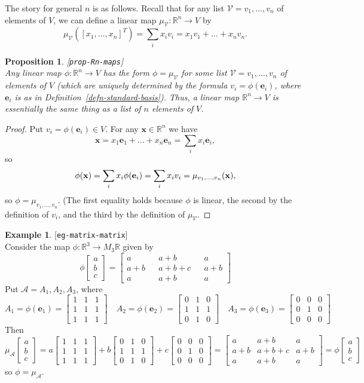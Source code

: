 \documentclass{amsart}
\newcommand{\lbl}[1]{\label{#1}\textup{[\texttt{#1}]}\ \\}
\newcommand{\lbl}{\label}
\newcommand{\R}         {{\mathbb{R}}}
\newcommand{\bsm}       {\left[\begin{smallmatrix}}
\newcommand{\esm}       {\end{smallmatrix}\right]}
\newcommand{\xra}       {\xrightarrow}
\newcommand{\ve}        {\mathbf{e}}
\newcommand{\vx}        {\mathbf{x}}
\newcommand{\CA}        {{\mathcal{A}}}
\newcommand{\CV}        {{\mathcal{V}}}
\renewcommand{\:}       {\colon}
\newtheorem{proposition}[theorem]{Proposition}
\theoremstyle{definition}
\newtheorem{example}[theorem]{Example}
\begin{document}
The story for general $n$ is as follows.  Recall that for
any list $\CV=v_1,\ldots,v_n$ of elements of $V$, we can
define a linear map $\mu_{\CV}\:\R^n\xra{}V$ by
\[ \mu_{\CV}([x_1,\ldots,x_n]^T) = \sum_i x_iv_i = 
     x_1v_1 + \ldots + x_nv_n.
\]

\begin{proposition}\lbl{prop-Rn-maps}
 Any linear map $\phi\:\R^n\xra{}V$ has the form
 $\phi=\mu_{\CV}$ for some list $\CV=v_1,\ldots,v_n$ of
 elements of $V$ (which are uniquely determined by the
 formula $v_i=\phi(\ve_i)$, where $\ve_i$ is as in
 Definition~\ref{defn-standard-basis}).  Thus, a linear map
 $\R^n\xra{}V$ is essentially the same thing as a list of
 $n$ elements of $V$.
\end{proposition}
\begin{proof}
 Put $v_i=\phi(\ve_i)\in V$.  For any $\vx\in\R^n$ we have 
 \[ \vx = x_1\ve_1+\ldots+x_n\ve_n = \sum_i x_i\ve_i, \]
 so 
 \[
  \phi(\vx) = \sum_i x_i\phi(\ve_i) \\
            = \sum_i x_iv_i \\
            = \mu_{v_1,\ldots,v_n}(\vx),
 \]
 so $\phi=\mu_{v_1,\ldots,v_n}$.  (The first equality holds because
 $\phi$ is linear, the second by the definition of $v_i$, and the
 third by the definition of $\mu_{\CV}$.
\end{proof}

\begin{example}\lbl{eg-matrix-matrix}
 {Consider the map $\phi\:\R^3\to M_3\R$ given by
 \[ \phi\bsm a\\ b\\ c\esm = 
     \bsm a   && a+b   && a   \\
          a+b && a+b+c && a+b \\
          a   && a+b   && a    \esm
 \]} 
 {Put $\CA=A_1,A_2,A_3$, where 
 \[ A_1=\phi(\ve_1)=\bsm 1&1&1\\1&1&1\\1&1&1 \esm \hspace{1em}
    A_2=\phi(\ve_2)=\bsm 0&1&0\\1&1&1\\0&1&0 \esm \hspace{1em}
    A_3=\phi(\ve_3)=\bsm 0&0&0\\0&1&0\\0&0&0 \esm
 \]}
 {Then
 \[ \mu_\CA\bsm a\\ b\\ c\esm =
      a \bsm 1&1&1\\1&1&1\\1&1&1 \esm + 
      b \bsm 0&1&0\\1&1&1\\0&1&0 \esm +
      c \bsm 0&0&0\\0&1&0\\0&0&0 \esm = 
     \bsm a   & a+b   & a   \\
          a+b & a+b+c & a+b \\
          a   & a+b   & a    \esm = \phi\bsm a\\ b\\ c\esm
 \]}
 {so $\phi=\mu_\CA$. }
\end{example}
\end{document}

